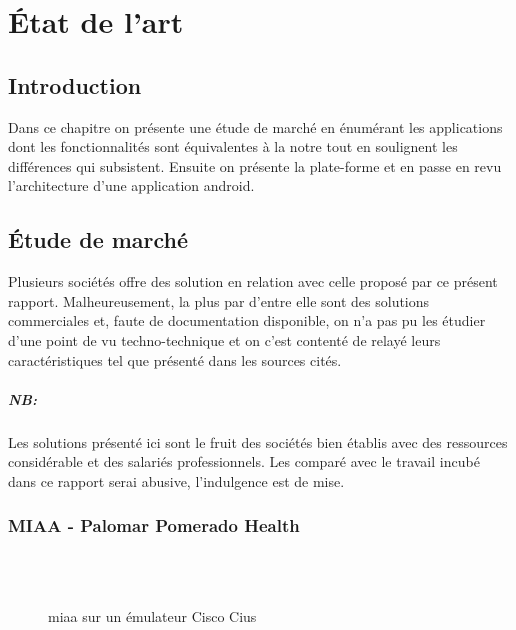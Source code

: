
\chapter{État de l'art}
\section{Introduction}
Dans ce chapitre on présente une étude de marché en énumérant
les applications dont les fonctionnalités sont équivalentes à la
notre tout en soulignent les différences qui subsistent. Ensuite on
présente la plate-forme \android{} et en passe en revu l'architecture
d'une application android.

\section{Étude de marché}
Plusieurs sociétés offre des solution en relation avec celle proposé
par ce présent rapport. Malheureusement, la plus par d'entre elle sont
des solutions commerciales et, faute de documentation disponible, on
n'a pas pu les étudier d'une point de vu techno-technique et on c'est
contenté de relayé leurs caractéristiques tel que présenté dans
les sources cités.

\paragraph{NB:} %
\label{par:nb}

Les solutions présenté ici sont le fruit des sociétés bien établis avec des
ressources considérable et des salariés professionnels. Les comparé avec le
travail incubé dans ce rapport serai abusive, l'indulgence est de mise.


\subsection{MIAA - Palomar Pomerado Health}

\begin{figure}
\centering
{}\\
\\
\caption{\gls{miaa} sur un émulateur Cisco Cius}
\label{fig:miaa}
\end{figure}

